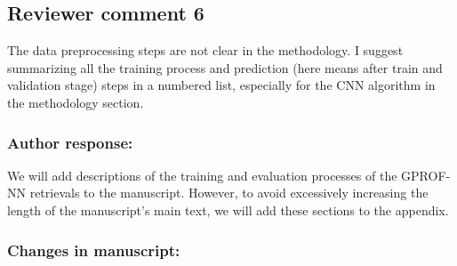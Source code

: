 \subsection*{Reviewer comment 6}

The data preprocessing steps are not clear in the methodology. I suggest
summarizing all the training process and prediction (here means after train and
validation stage) steps in a numbered list, especially for the CNN algorithm in
the methodology section.

\subsubsection*{Author response:}


We will add descriptions of the training and evaluation processes of the
GPROF-NN retrievals to the manuscript. However, to avoid excessively increasing
the length of the manuscript's main text, we will add these sections to the
appendix.

\subsubsection*{Changes in manuscript:}

